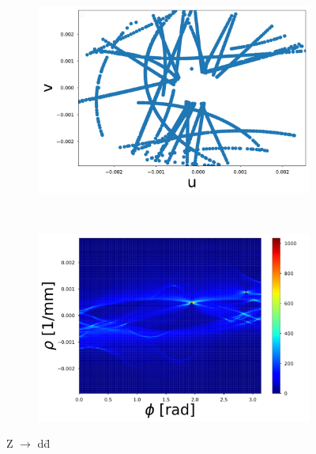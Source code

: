 \documentclass{cernatsnote}
\begin{document}
\begin{figure}[ht]
\begin{subfigure}[b]{0.3\textwidth}
    \end{subfigure}
		~ %
		\begin{subfigure}[b]{0.3\textwidth}
					\includegraphics[width=\textwidth]{figures/CT_Zdd.pdf}
					\caption{}
			\end{subfigure}
			~ %
			\begin{subfigure}[b]{0.3\textwidth}
						\includegraphics[width=\textwidth]{figures/HT_Zdd.pdf}
						\caption{}
				\end{subfigure}
	\label{HTZdd}
	\caption{Z $\rightarrow$ d\={d}}
\end{figure}



\end{document}
